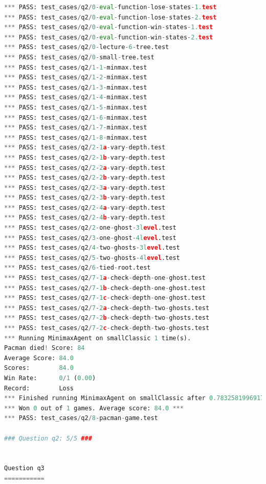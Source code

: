 \documentclass{report}
\begin{document}
\begin{lstlisting}[language=Python, caption=Resultados del Autograder]
*** PASS: test_cases/q2/0-eval-function-lose-states-1.test
*** PASS: test_cases/q2/0-eval-function-lose-states-2.test
*** PASS: test_cases/q2/0-eval-function-win-states-1.test
*** PASS: test_cases/q2/0-eval-function-win-states-2.test
*** PASS: test_cases/q2/0-lecture-6-tree.test
*** PASS: test_cases/q2/0-small-tree.test
*** PASS: test_cases/q2/1-1-minmax.test
*** PASS: test_cases/q2/1-2-minmax.test
*** PASS: test_cases/q2/1-3-minmax.test
*** PASS: test_cases/q2/1-4-minmax.test
*** PASS: test_cases/q2/1-5-minmax.test
*** PASS: test_cases/q2/1-6-minmax.test
*** PASS: test_cases/q2/1-7-minmax.test
*** PASS: test_cases/q2/1-8-minmax.test
*** PASS: test_cases/q2/2-1a-vary-depth.test
*** PASS: test_cases/q2/2-1b-vary-depth.test
*** PASS: test_cases/q2/2-2a-vary-depth.test
*** PASS: test_cases/q2/2-2b-vary-depth.test
*** PASS: test_cases/q2/2-3a-vary-depth.test
*** PASS: test_cases/q2/2-3b-vary-depth.test
*** PASS: test_cases/q2/2-4a-vary-depth.test
*** PASS: test_cases/q2/2-4b-vary-depth.test
*** PASS: test_cases/q2/2-one-ghost-3level.test
*** PASS: test_cases/q2/3-one-ghost-4level.test
*** PASS: test_cases/q2/4-two-ghosts-3level.test
*** PASS: test_cases/q2/5-two-ghosts-4level.test
*** PASS: test_cases/q2/6-tied-root.test
*** PASS: test_cases/q2/7-1a-check-depth-one-ghost.test
*** PASS: test_cases/q2/7-1b-check-depth-one-ghost.test
*** PASS: test_cases/q2/7-1c-check-depth-one-ghost.test
*** PASS: test_cases/q2/7-2a-check-depth-two-ghosts.test
*** PASS: test_cases/q2/7-2b-check-depth-two-ghosts.test
*** PASS: test_cases/q2/7-2c-check-depth-two-ghosts.test
*** Running MinimaxAgent on smallClassic 1 time(s).
Pacman died! Score: 84
Average Score: 84.0
Scores:        84.0
Win Rate:      0/1 (0.00)
Record:        Loss
*** Finished running MinimaxAgent on smallClassic after 0.7832581996917725 seconds.
*** Won 0 out of 1 games. Average score: 84.0 ***
*** PASS: test_cases/q2/8-pacman-game.test

### Question q2: 5/5 ###


Question q3
===========


\end{lstlisting}
\end{document}
